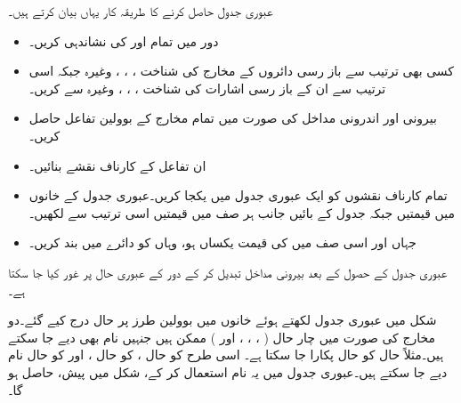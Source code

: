 عبوری جدول حاصل کرنے کا طریقہ کار یہاں بیان کرتے ہیں۔
\begin{itemize}
\item
دور میں تمام اور  کی نشاندہی کریں۔
\item
 کسی بھی ترتیب سے باز رسی دائروں کے مخارج کی شناخت ، ، ، وغیرہ جبکہ اسی ترتیب سے ان کے باز رسی اشارات کی شناخت ، ، ، وغیرہ سے کریں۔
\item
 بیرونی اور اندرونی مداخل کی صورت میں تمام مخارج کے بوولین تفاعل حاصل کریں۔
\item 
 ان تفاعل کے کارناف نقشے بنائیں۔
\item 
 تمام کارناف نقشوں کو ایک عبوری جدول میں یکجا کریں۔عبوری جدول کے خانوں میں  قیمتیں جبکہ جدول کے بائیں جانب ہر صف میں  قیمتیں اسی ترتیب سے لکھیں۔
\item 
 جہاں  اور اسی صف میں  کی قیمت یکساں ہو، وہاں  کو دائرے میں بند کریں۔
 \end{itemize}
عبوری جدول کے حصول کے بعد بیرونی مداخل تبدیل کر کے دور کے عبوری حال پر غور کیا جا سکتا ہے۔ 

شکل  میں عبوری جدول لکھتے ہوئے خانوں میں بوولین طرز پر حال درج کیے گئے۔دو مخارج کی صورت میں چار حال ( ، ، ، اور  ) ممکن ہیں جنہیں نام بھی دیے جا سکتے ہیں۔مثلاً حال  کو حال  پکارا جا سکتا ہے۔ اسی طرح  کو حال ،  کو حال ، اور  کو حال  نام دیے جا سکتے ہیں۔عبوری جدول میں یہ نام استعمال کر کے، شکل    میں پیش،  حاصل ہو گا۔

